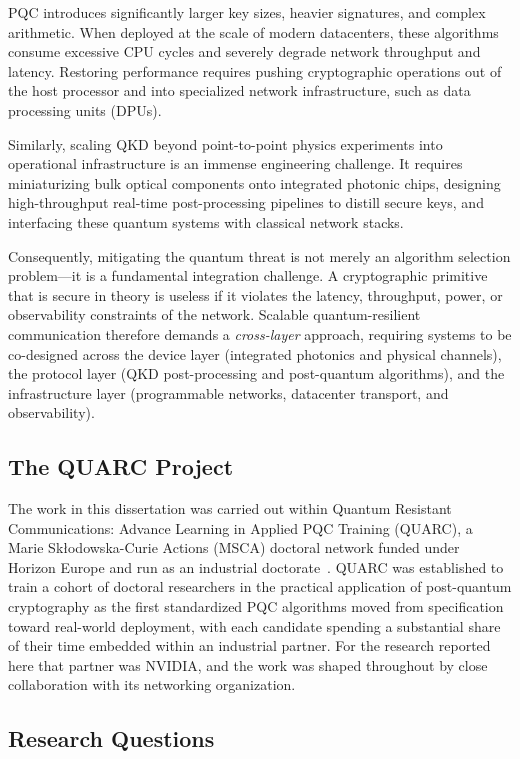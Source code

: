 PQC introduces significantly larger key sizes, heavier signatures, and complex arithmetic. When deployed at the scale of modern datacenters, these algorithms consume excessive CPU cycles and severely degrade network throughput and latency. Restoring performance requires pushing cryptographic operations out of the host processor and into specialized network infrastructure, such as data processing units (DPUs).

Similarly, scaling QKD beyond point-to-point physics experiments into operational infrastructure is an immense engineering challenge. It requires miniaturizing bulk optical components onto integrated photonic chips, designing high-throughput real-time post-processing pipelines to distill secure keys, and interfacing these quantum systems with classical network stacks.

Consequently, mitigating the quantum threat is not merely an algorithm selection problem---it is a fundamental integration challenge. A cryptographic primitive that is secure in theory is useless if it violates the latency, throughput, power, or observability constraints of the network. Scalable quantum-resilient communication therefore demands a \emph{cross-layer} approach, requiring systems to be co-designed across the device layer (integrated photonics and physical channels), the protocol layer (QKD post-processing and post-quantum algorithms), and the infrastructure layer (programmable networks, datacenter transport, and observability).

\subsection{The QUARC Project}

The work in this dissertation was carried out within Quantum Resistant
Communications: Advance Learning in Applied PQC Training (QUARC), a Marie
Sk\l{}odowska-Curie Actions (MSCA) doctoral network funded under Horizon Europe and run
as an industrial doctorate~\cite{QUARC2022,quarcwebsite}. QUARC was established to
train a cohort of doctoral researchers in the practical application of
post-quantum cryptography as the first standardized PQC algorithms moved from
specification toward real-world deployment, with each candidate spending a
substantial share of their time embedded within an industrial partner. For the
research reported here that partner was NVIDIA, and the work was shaped
throughout by close collaboration with its networking organization.

\subsection{Research Questions}

